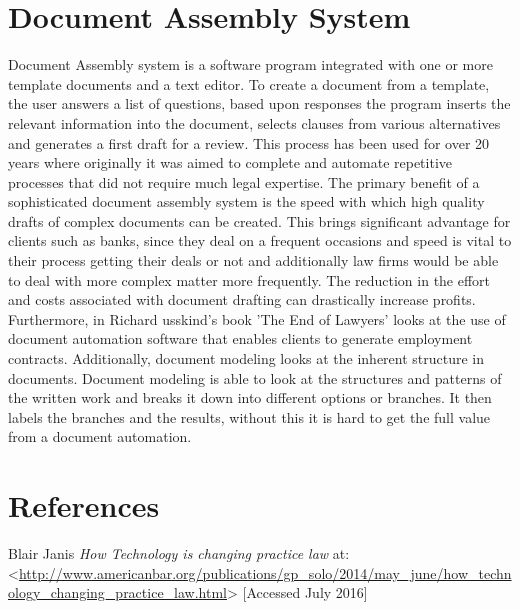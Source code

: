 \documentclass[12pt]{article}
\begin{document}
\section{Document Assembly System}
Document Assembly system is a software program integrated with one or more template documents and a text editor. To create a document from a template, the user answers a list of questions, based upon responses the program inserts the relevant information into the document, selects clauses from various alternatives and generates a first draft for a review. This process has been used for over 20 years where originally it was aimed to complete and automate repetitive processes that did not require much legal expertise. 
\newline
\newline
The primary benefit of a sophisticated document assembly system is the speed with which high quality drafts of complex documents can be created. This brings significant advantage for clients such as banks, since they deal on a frequent occasions and speed is vital to their process getting their deals or not and additionally law firms would be able to deal with more complex matter more frequently. The reduction in the effort and costs associated with document drafting can drastically increase profits. 
\newline
\newline
Furthermore, in Richard usskind's book 'The End of Lawyers' looks at the use of document automation software that enables clients to generate employment contracts. Additionally, document modeling looks at the inherent structure in documents. Document modeling is able to look at the structures and patterns of the written work and breaks it down into different options or branches. It then labels the branches and the results, without this it is hard to get the full value from a document automation. 


\newpage
\section*{References}

Blair Janis \textit{How Technology is changing practice law}  at:<\url{http://www.americanbar.org/publications/gp_solo/2014/may_june/how_technology_changing_practice_law.html}> [Accessed July 2016]
\newline
\newline
\end{document}
